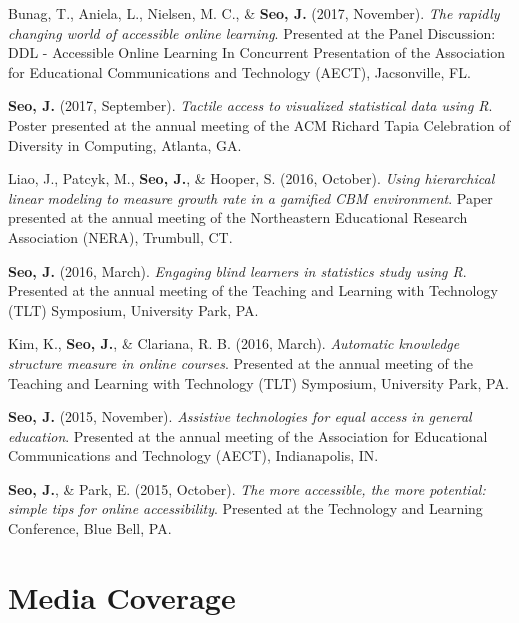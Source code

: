 \documentclass[11pt,a4paper,]{awesome-cv}
\begin{document}
Bunag, T., Aniela, L., Nielsen, M. C., \& \textbf{Seo, J.} (2017,
November). \emph{The rapidly changing world of accessible online
learning}. Presented at the Panel Discussion: DDL - Accessible Online
Learning In Concurrent Presentation of the Association for Educational
Communications and Technology (AECT), Jacsonville, FL.

\textbf{Seo, J.} (2017, September). \emph{Tactile access to visualized
statistical data using R}. Poster presented at the annual meeting of the
ACM Richard Tapia Celebration of Diversity in Computing, Atlanta, GA.

Liao, J., Patcyk, M., \textbf{Seo, J.}, \& Hooper, S. (2016, October).
\emph{Using hierarchical linear modeling to measure growth rate in a
gamified CBM environment}. Paper presented at the annual meeting of the
Northeastern Educational Research Association (NERA), Trumbull, CT.

\textbf{Seo, J.} (2016, March). \emph{Engaging blind learners in
statistics study using R}. Presented at the annual meeting of the
Teaching and Learning with Technology (TLT) Symposium, University Park,
PA.

Kim, K., \textbf{Seo, J.}, \& Clariana, R. B. (2016, March).
\emph{Automatic knowledge structure measure in online courses}.
Presented at the annual meeting of the Teaching and Learning with
Technology (TLT) Symposium, University Park, PA.

\textbf{Seo, J.} (2015, November). \emph{Assistive technologies for
equal access in general education}. Presented at the annual meeting of
the Association for Educational Communications and Technology (AECT),
Indianapolis, IN.

\textbf{Seo, J.}, \& Park, E. (2015, October). \emph{The more
accessible, the more potential: simple tips for online accessibility}.
Presented at the Technology and Learning Conference, Blue Bell, PA.

\section{Media Coverage}\label{media-coverage}
\end{document}
